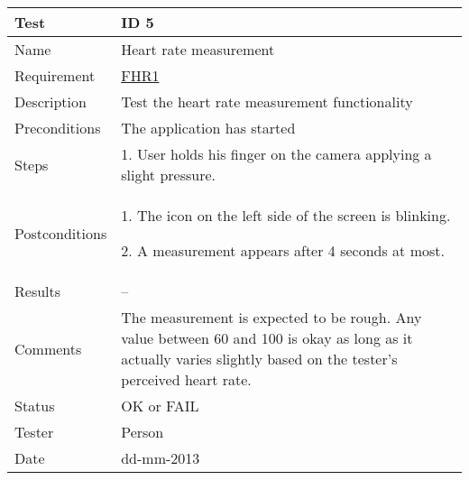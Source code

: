 \begin{table}
\begin{center}
\begin{tabular}{ | l | p{10cm} | }
	\hline
	\textbf{Test}	&	\textbf{ID 5} \\
	\hline\noalign{\smallskip}\noalign{\smallskip}\hline
	Name				& Heart rate measurement \\
	Requirement			& \hyperref[table:reqheartrate]{FHR1} \\
	Description			& Test the heart rate measurement functionality \\
	Preconditions		& The application has started \\
	Steps 				&	\par 1. User holds his finger on the camera applying a slight pressure. \\
	Postconditions		&	\par 1. The icon on the left side of the screen is blinking.
							\par 2. A measurement appears after 4 seconds at most.\\
	Results				& -- \\
	Comments			&	The measurement is expected to be rough.
							Any value between 60 and 100 is okay as long as it actually varies slightly based
							on the tester's perceived heart rate.  \\
	Status				& OK or FAIL \\
	Tester				& Person \\
	Date				& dd-mm-2013 \\
	\hline
\end{tabular}
\end{center}
\end{table}